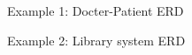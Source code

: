 
\begin{flushleft}


	Example 1: Docter-Patient ERD
	
	Example 2: Library system ERD

\end{flushleft}

\newpage